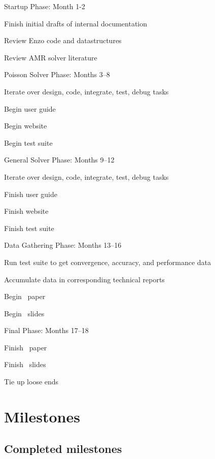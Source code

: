 \documentclass[11pt]{article}
\begin{document}
\BeginDESCRIPTION
  \item [Startup Phase: ] Month 1-2
    \BeginITEMIZE
      \item Finish initial drafts of internal documentation
      \item Review Enzo code and datastructures
      \item Review AMR solver literature
    \EndITEMIZE 
  \item [Poisson Solver Phase:] Months 3--8
    \BeginITEMIZE
      \item Iterate over design, code, integrate, test, debug tasks
      \item Begin user guide
      \item Begin website
      \item Begin test suite
    \EndITEMIZE
  \item [General Solver Phase:] Months 9--12
    \BeginITEMIZE
      \item Iterate over design, code, integrate, test, debug tasks
      \item Finish user guide
      \item Finish website
      \item Finish test suite
    \EndITEMIZE
  \item [Data Gathering Phase:] Months 13--16
    \BeginITEMIZE
      \item Run test suite to get convergence, accuracy, and performance data
      \item Accumulate data in corresponding technical reports
      \item Begin \amrSolve\ paper
      \item Begin \amrSolve\ slides
    \EndITEMIZE
  \item [Final Phase:] Months 17--18
    \BeginITEMIZE
      \item Finish \amrSolve\ paper
      \item Finish \amrSolve\ slides
      \item Tie up loose ends
    \EndITEMIZE
\EndDESCRIPTION

\section{Milestones}

\subsection{Completed milestones}
\end{document}
